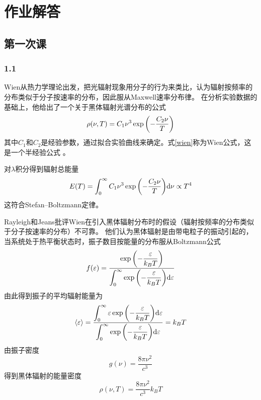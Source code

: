 
\chapter{作业解答}

\section{第一次课}
\subsection{1.1}
Wien从热力学理论出发，把光辐射现象用分子的行为来类比，认为辐射按频率的分布类似于分子按速率的分布，因此服从Maxwell速率分布律。
在分析实验数据的基础上，他给出了一个关于黑体辐射光谱分布的公式
\begin{equation}\label{wien}
\rho(\nu,T) = C_1 \nu^3 \exp\qty(-\dfrac{C_2 \nu}{ T})
\end{equation}
其中$ C_1 $和$ C_2 $是经验参数，通过拟合实验曲线来确定。式\eqref{wien}称为Wien公式，这是一个半经验公式%
。

对$ \lambda $积分得到辐射总能量
\begin{equation}
E(T) = \int_0^\infty C_1\nu^3 \exp\qty(-\dfrac{C_2 \nu}{ T}) \mathrm{d}\nu \propto T^4
\end{equation}
这符合Stefan--Boltzmann定律。

Rayleigh和Jeans批评Wien在引入黑体辐射分布时的假设（辐射按频率的分布类似于分子按速率的分布）不可靠。
他们认为黑体辐射是由带电粒子的振动引起的，当系统处于热平衡状态时，振子数目按能量的分布服从Boltzmann公式
\begin{equation}
f(\varepsilon) = \dfrac{\exp\qty(-\dfrac{\varepsilon}{k_B T})}{\displaystyle\int_0^\infty \exp\qty(-\dfrac{\varepsilon}{k_B T}) \mathrm{d}\varepsilon}
\end{equation}
由此得到振子的平均辐射能量为
\begin{equation}
\ev{\varepsilon} = \dfrac{\displaystyle\int_0^\infty \varepsilon \exp\qty(-\dfrac{\varepsilon}{k_B T}) \dd\varepsilon
}{\displaystyle\int_0^\infty \exp\qty(-\dfrac{\varepsilon}{k_B T}) \dd\varepsilon} = k_B T
\end{equation}
由振子密度
\begin{equation}
g(\nu) = \dfrac{8\pi\nu^2}{c^3}
\end{equation} 
得到黑体辐射的能量密度
\begin{equation}
\rho(\nu, T) = \dfrac{8\pi\nu^2}{c^3} k_B T
\end{equation}

